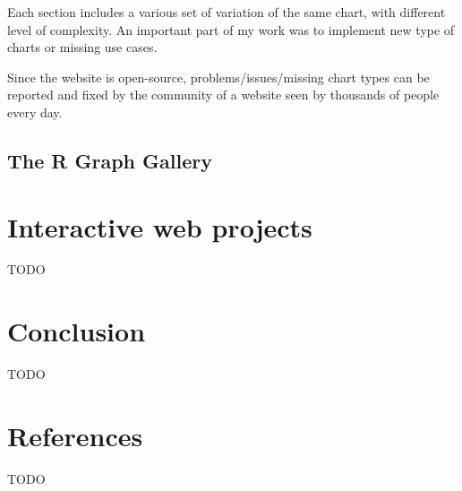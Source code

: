 \documentclass[
]{article}
\begin{document}
Each section includes a various set of variation of the same chart, with
different level of complexity. An important part of my work was to
implement new type of charts or missing use cases.

Since the website is open-source, problems/issues/missing chart types
can be reported and fixed by the community of a website seen by
thousands of people every day.

\subsection{The R Graph Gallery}\label{the-r-graph-gallery}

\newpage

\section{Interactive web projects}\label{interactive-web-projects}

TODO

\newpage

\section{Conclusion}\label{conclusion}

TODO

\newpage

\section{References}\label{references}

TODO
\end{document}
